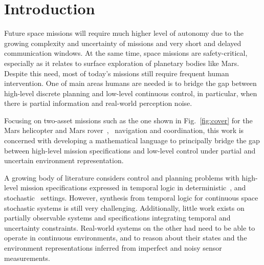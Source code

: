 \documentclass[conference]{IEEEtran}
\begin{document}
\IEEEpeerreviewmaketitle

	
	\section{Introduction} \label{subsec:intro}
	Future space missions will require much higher level of autonomy due to the growing complexity and uncertainty of missions and very short and delayed communication windows. At the same time, space missions are safety-critical, especially as it relates to surface exploration of planetary bodies like Mars. Despite this need, most of today’s missions still require frequent human intervention. One of main areas humans are needed is to bridge the gap between high-level discrete planning and low-level continuous control, in particular, when there is partial information and real-world perception noise.

    Focusing on two-asset missions such as the one shown in Fig.~\ref{fig:cover} for the Mars helicopter and Mars rover~\cite{traverse2020},~\cite{mars2012} navigation and coordination, this work is concerned with developing a mathematical language to principally bridge the gap between high-level mission specifications and low-level control under partial and uncertain environment representation.
    
    A growing body of literature considers control and planning problems with high-level mission specifications
    expressed in temporal logic in
    deterministic~\cite{KB-TAC08-LTLCon,kress-gazit:whereswaldo?,Murray2009,VaBe-IROS-2013}, and
    stochastic~\cite{Lahijanian2012,svorenova2013,Ayala2014,Cristi-CDC-2016,Kaelbling98} settings.
    However, synthesis from temporal logic for continuous space stochastic systems is still very challenging.
    Additionally, little work exists on partially observable systems and specifications integrating
    temporal and uncertainty constraints.
    Real-world systems on the other had need to be able to operate in continuous environments, and to reason
    about their states and the environment representations inferred from imperfect and noisy sensor measurements.
    
\end{document}
